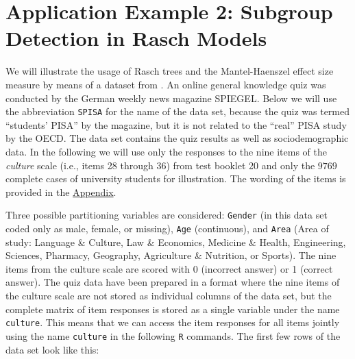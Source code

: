 \documentclass[doc,floatsintext,natbib]{apa7}
\begin{document}
\newpage
\FloatBarrier
\section{Application Example 2: Subgroup Detection in Rasch Models}
\label{sec:TutorialRasch}


We will illustrate the usage of Rasch trees and the Mantel-Haenszel effect size measure by means of a dataset from \citet{SPISA:book}. An online general knowledge quiz was conducted by the German
weekly news magazine SPIEGEL. Below we will use the abbreviation \texttt{SPISA} for the name of the data set, because the quiz was termed ``students' PISA'' by the magazine, but it is not related to the ``real'' PISA study by the OECD. The data set contains the quiz results as well as sociodemographic data. In the following we will use only the responses to the nine items of the \textit{culture} scale (i.e., items 28 through 36) from test booklet 20 and only the $9769$ complete cases of university students for illustration. The wording of the items is provided in the \hyperref[sec:AppendixA]{Appendix}.

Three possible partitioning variables are considered: \texttt{Gender} (in this data set coded only as male, female, or missing), \texttt{Age} (continuous), and \texttt{Area} (Area of study: Language \& Culture, Law \& Economics, Medicine \& Health, Engineering, Sciences, Pharmacy, Geography, Agriculture \& Nutrition, or Sports). The nine items from the culture scale are scored with 0 (incorrect answer) or 1 (correct answer). 
The quiz data have been prepared in a format where the nine items of the culture scale are not stored as individual columns of the data set, but the complete matrix of item responses is stored as a single variable \citep[see][]{raschtree:vignette} under the name \texttt{culture}. This means that we can access the item responses for all items jointly using the name \texttt{culture} in the following \texttt{R} commands. The first few rows of the data set look like this:

\end{document}
